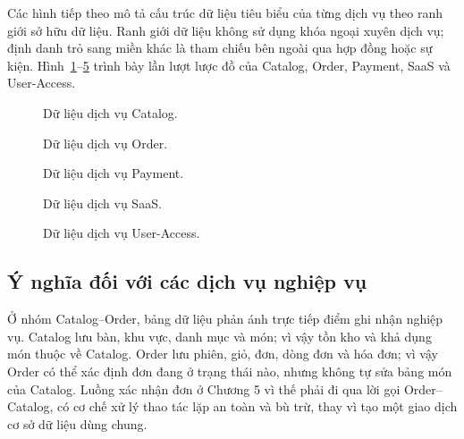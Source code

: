 Các hình tiếp theo mô tả cấu trúc dữ liệu tiêu biểu của từng dịch vụ theo ranh giới sở hữu dữ liệu. Ranh giới dữ liệu không sử dụng khóa ngoại xuyên dịch vụ; định danh trỏ sang miền khác là tham chiếu bên ngoài qua hợp đồng hoặc sự kiện. Hình~\ref{fig:chapter4-db-catalog-schema}--\ref{fig:chapter4-db-user-access-schema} trình bày lần lượt lược đồ của Catalog, Order, Payment, SaaS và User-Access.

\begin{figure}[H]
  \centering
  
  \caption{Dữ liệu dịch vụ Catalog.}
  \label{fig:chapter4-db-catalog-schema}
\end{figure}

\begin{figure}[H]
  \centering
  
  \caption{Dữ liệu dịch vụ Order.}
  \label{fig:chapter4-db-order-schema}
\end{figure}

\begin{figure}[H]
  \centering
  
  \caption{Dữ liệu dịch vụ Payment.}
  \label{fig:chapter4-db-payment-schema}
\end{figure}

\begin{figure}[H]
  \centering
  
  \caption{Dữ liệu dịch vụ SaaS.}
  \label{fig:chapter4-db-saas-schema}
\end{figure}

\begin{figure}[H]
  \centering
  
  \caption{Dữ liệu dịch vụ User-Access.}
  \label{fig:chapter4-db-user-access-schema}
\end{figure}

\subsection{Ý nghĩa đối với các dịch vụ nghiệp vụ}

Ở nhóm Catalog--Order, bảng dữ liệu phản ánh trực tiếp điểm ghi nhận nghiệp vụ. Catalog lưu bàn, khu vực, danh mục và món; vì vậy tồn kho và khả dụng món thuộc về Catalog. Order lưu phiên, giỏ, đơn, dòng đơn và hóa đơn; vì vậy Order có thể xác định đơn đang ở trạng thái nào, nhưng không tự sửa bảng món của Catalog. Luồng xác nhận đơn ở Chương 5 vì thế phải đi qua lời gọi Order--Catalog, có cơ chế xử lý thao tác lặp an toàn và bù trừ, thay vì tạo một giao dịch cơ sở dữ liệu dùng chung.


